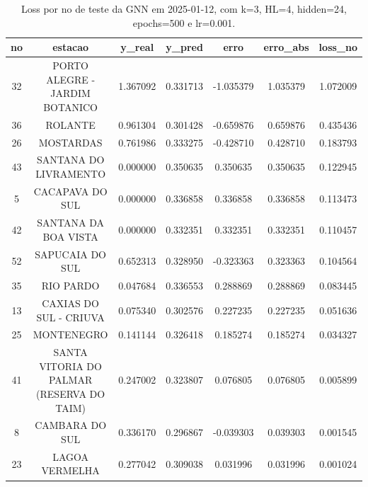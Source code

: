 \begin{table}[h]
\centering
\caption{Loss por no de teste da GNN em 2025-01-12, com k=3, HL=4, hidden=24, epochs=500 e lr=0.001.}
\label{tab:gnn_loss_k3_hl4_h24_e500_d20250112}
\begin{tabular}{ccccccc}
\toprule
no & estacao & y\_real & y\_pred & erro & erro\_abs & loss\_no \\
\midrule
32 & PORTO ALEGRE - JARDIM BOTANICO & 1.367092 & 0.331713 & -1.035379 & 1.035379 & 1.072009 \\
36 & ROLANTE & 0.961304 & 0.301428 & -0.659876 & 0.659876 & 0.435436 \\
26 & MOSTARDAS & 0.761986 & 0.333275 & -0.428710 & 0.428710 & 0.183793 \\
43 & SANTANA DO LIVRAMENTO & 0.000000 & 0.350635 & 0.350635 & 0.350635 & 0.122945 \\
5 & CACAPAVA DO SUL & 0.000000 & 0.336858 & 0.336858 & 0.336858 & 0.113473 \\
42 & SANTANA DA BOA VISTA & 0.000000 & 0.332351 & 0.332351 & 0.332351 & 0.110457 \\
52 & SAPUCAIA DO SUL & 0.652313 & 0.328950 & -0.323363 & 0.323363 & 0.104564 \\
35 & RIO PARDO & 0.047684 & 0.336553 & 0.288869 & 0.288869 & 0.083445 \\
13 & CAXIAS DO SUL - CRIUVA & 0.075340 & 0.302576 & 0.227235 & 0.227235 & 0.051636 \\
25 & MONTENEGRO & 0.141144 & 0.326418 & 0.185274 & 0.185274 & 0.034327 \\
41 & SANTA VITORIA DO PALMAR (RESERVA DO TAIM) & 0.247002 & 0.323807 & 0.076805 & 0.076805 & 0.005899 \\
8 & CAMBARA DO SUL & 0.336170 & 0.296867 & -0.039303 & 0.039303 & 0.001545 \\
23 & LAGOA VERMELHA & 0.277042 & 0.309038 & 0.031996 & 0.031996 & 0.001024 \\
\bottomrule
\end{tabular}
\end{table}
